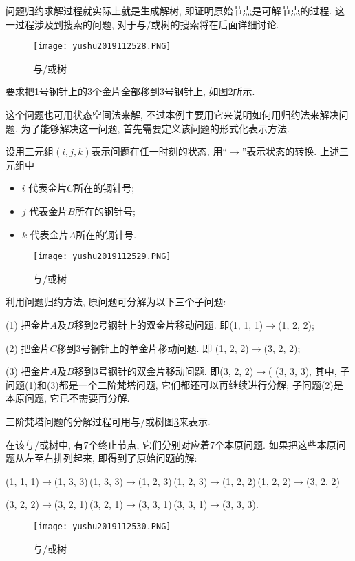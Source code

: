 问题归约求解过程就实际上就是生成解树, 即证明原始节点是可解节点的过程. 这一过程涉及到搜索的问题, 对于与/或树的搜索将在后面详细讨论.
\begin{figure}[H]
\centering
\texttt{[image: yushu2019112528.PNG]}
\caption{与/或树 }
\label{AI32fig28}
\end{figure}
\begin{example}
   要求把1号钢针上的3个金片全部移到3号钢针上, 如图\ref{AI32fig29}所示.
\end{example}
\begin{answer}
这个问题也可用状态空间法来解, 不过本例主要用它来说明如何用归约法来解决问题.
为了能够解决这一问题, 首先需要定义该问题的形式化表示方法.

设用三元组$(i, j, k)$表示问题在任一时刻的状态, 用“$\rightarrow$”表示状态的转换. 上述三元组中
\begin{itemize}
\item $i$ 代表金片$C$所在的钢针号;
\item $j$ 代表金片$B$所在的钢针号;
\item $k$ 代表金片$A$所在的钢针号.
\end{itemize}
\begin{figure}[H]
\centering
\texttt{[image: yushu2019112529.PNG]}
\caption{与/或树 }
\label{AI32fig29}
\end{figure}
利用问题归约方法, 原问题可分解为以下三个子问题:

(1) 把金片$A$及$B$移到2号钢针上的双金片移动问题. 即(1, 1, 1)$\rightarrow$(1, 2, 2);

(2) 把金片$C$移到3号钢针上的单金片移动问题. 即 (1, 2, 2)$\rightarrow$(3, 2, 2);

(3) 把金片$A$及$B$移到3号钢针的双金片移动问题. 即(3, 2, 2)$\rightarrow$( (3, 3, 3), 其中, 子问题(1)和(3)都是一个二阶梵塔问题, 它们都还可以再继续进行分解; 子问题(2)是本原问题, 它已不需要再分解.

三阶梵塔问题的分解过程可用与/或树图\ref{AI32fig2019120230}来表示.

在该与/或树中, 有7个终止节点, 它们分别对应着7个本原问题. 如果把这些本原问题从左至右排列起来, 即得到了原始问题的解:

(1, 1, 1)$\rightarrow$(1, 3, 3)\,(1, 3, 3)$\rightarrow$(1, 2, 3)\,(1, 2, 3)$\rightarrow$(1, 2, 2)\,(1, 2, 2)$\rightarrow$(3, 2, 2)

(3, 2, 2)$\rightarrow$(3, 2, 1)\,(3, 2, 1)$\rightarrow$(3, 3, 1)\,(3, 3, 1)$\rightarrow$(3, 3, 3).
\begin{figure}[H]
\centering
\texttt{[image: yushu2019112530.PNG]}
\caption{与/或树 }
\label{AI32fig2019120230}
\end{figure}
\end{answer}
